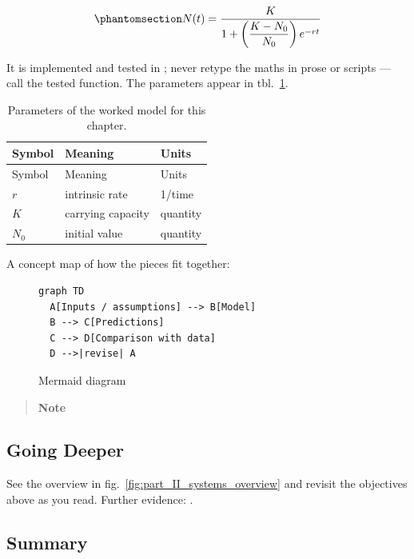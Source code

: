 \documentclass[
]{article}
\theoremstyle{plain}
\theoremstyle{definition}
\begin{document}
\begin{equation}\protect\phantomsection\label{eq:part_II_systems_overview_model}{ N(t) = \frac{K}{1 + \left(\dfrac{K - N_0}{N_0}\right) e^{-rt}} }\end{equation}

It is implemented and tested in
; never retype the maths in
prose or scripts --- call the tested function. The parameters appear in
tbl.~\ref{tbl:part_II_systems_overview_parameters}.

\begin{longtable}[]{@{}lll@{}}
\caption{Parameters of the worked model for this
chapter.}\label{tbl:part_II_systems_overview_parameters}\tabularnewline
\toprule\noalign{}
Symbol & Meaning & Units \\
\midrule\noalign{}
\endfirsthead
\toprule\noalign{}
Symbol & Meaning & Units \\
\midrule\noalign{}
\endhead
\bottomrule\noalign{}
\endlastfoot
\(r\) & intrinsic rate & 1/time \\
\(K\) & carrying capacity & quantity \\
\(N_0\) & initial value & quantity \\
\end{longtable}

A concept map of how the pieces fit together:

\begin{figure}[htbp]
\centering
\begin{verbatim}
graph TD
  A[Inputs / assumptions] --> B[Model]
  B --> C[Predictions]
  C --> D[Comparison with data]
  D -->|revise| A
\end{verbatim}
\caption{Mermaid diagram}
\end{figure}

\begin{quote}
\textbf{Note}
\end{quote}

\subsection{Going Deeper}\label{going-deeper-5}

See the overview in fig.~\ref{fig:part_II_systems_overview} and revisit
the objectives above as you read. Further evidence:
\citep{patel2018models, nguyen2023synthesis}.

\subsection{Summary}\label{summary-6}
\end{document}
